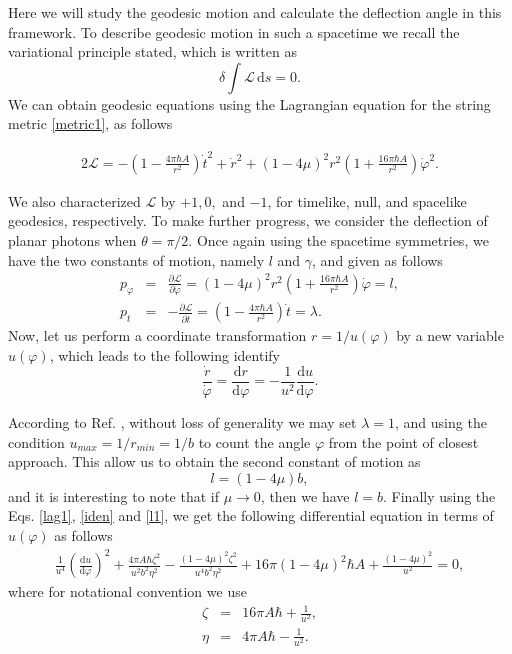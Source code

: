 \documentclass[preprint,superscriptaddress,amsfonts,amssymb,amsmath,showpacs]{revtex4}
\begin{document}
Here we will study the geodesic motion and calculate the deflection angle in this framework. To describe geodesic motion in such a spacetime we recall the variational principle stated, which is written as
\begin{equation}
\delta \int \mathcal{L} \,\mathrm{d}s=0.
\end{equation}
We can obtain geodesic equations using the Lagrangian equation for the string metric \eqref{metric1}, as follows
\begin{widetext}
\begin{eqnarray}\label{lag1}
2\mathcal{L}=-\left(1-\frac{4 \pi \hbar A}{r^2}   \right)\dot{t}^2+\dot{r}^2+(1-4 \mu)^2 r^2  \left(1+\frac{16 \pi \hbar A}{r^2} \right)\dot{\varphi}^2.
\end{eqnarray}
\end{widetext}
We also characterized $\mathcal{L}$ by $+1, 0,$ and $-1$, for timelike, null, and spacelike geodesics, respectively.
To make further progress,  we consider the deflection of planar photons when $\theta =\pi/2$. Once again using the spacetime symmetries, we have the two constants of motion, namely $l$ and $\gamma$, and given as follows \cite{Boyer}
\begin{eqnarray}
p_{\varphi}&=&\frac{\partial \mathcal{L}}{\partial \dot{\varphi}}= (1-4 \mu)^2 r^2  \left(1+\frac{16 \pi \hbar A}{r^2}   \right)\dot{\varphi} =l,\\
p_{t}&=&-\frac{\partial \mathcal{L}}{\partial \dot{t}}= \left(1-\frac{4 \pi \hbar A}{r^2} \right) \dot{t}=\lambda.
\end{eqnarray}
Now, let us perform a coordinate transformation $r = 1/u(\varphi)$ by a new variable
$u(\varphi)$, which leads to the following identify
\begin{equation}\label{iden}
\frac{\dot{r}}{\dot{\varphi}}=\frac{\mathrm{d}r}{\mathrm{d}\varphi}=-\frac{1}{u^2}\frac{\mathrm{d}u}{\mathrm{d}\varphi}.
\end{equation}

According to Ref. \cite{Boyer}, without loss of generality we may set $\lambda=1$, and
using the condition $ u_{max} = 1/r_{min} = 1/b$ \cite{Iorio} to count the angle $\varphi$ from the point of closest approach. This allow us to
obtain the second constant of motion as 
\begin{equation}\label{l1}
l = (1- 4 \mu) b,
\end{equation}
and it is interesting to note that if $\mu \to 0$, then we have $l = b$. Finally using the Eqs. \eqref{lag1}, \eqref{iden} and \eqref{l1}, we get the following differential equation in terms of $u(\varphi)$ as follows
\begin{eqnarray}\label{diff1}
\frac{1}{u^4}\left( \frac{\mathrm{d}u}{\mathrm{d}\varphi} \right)^2+\frac{4 \pi A \hbar \zeta^2}{u^2 b^2 \eta^2}-\frac{(1-4 \mu)^2 \zeta^2}{u^4 b^2 \eta^2}+16 \pi (1-4\mu)^2 \hbar A+\frac{(1-4\mu)^2}{u^2}=0,
\end{eqnarray}
where for notational convention we use
\begin{eqnarray}
\zeta &=& 16 \pi A \hbar + \frac{1}{u^2},\\
\eta & = & 4 \pi A \hbar - \frac{1}{u^2}.
\end{eqnarray}
\end{document}
